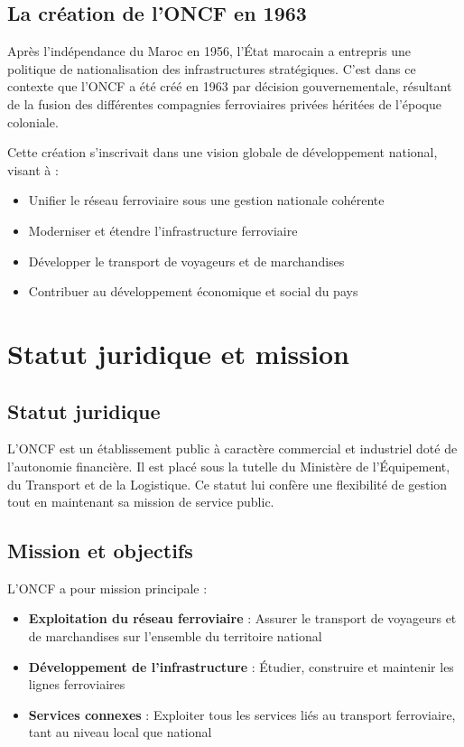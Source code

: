 \subsection{La création de l'ONCF en 1963}

Après l'indépendance du Maroc en 1956, l'État marocain a entrepris une politique de nationalisation des infrastructures stratégiques. C'est dans ce contexte que l'ONCF a été créé en 1963 par décision gouvernementale, résultant de la fusion des différentes compagnies ferroviaires privées héritées de l'époque coloniale.

Cette création s'inscrivait dans une vision globale de développement national, visant à :
\begin{itemize}
    \item Unifier le réseau ferroviaire sous une gestion nationale cohérente
    \item Moderniser et étendre l'infrastructure ferroviaire
    \item Développer le transport de voyageurs et de marchandises
    \item Contribuer au développement économique et social du pays
\end{itemize}

\section{Statut juridique et mission}

\subsection{Statut juridique}

L'ONCF est un établissement public à caractère commercial et industriel doté de l'autonomie financière. Il est placé sous la tutelle du Ministère de l'Équipement, du Transport et de la Logistique. Ce statut lui confère une flexibilité de gestion tout en maintenant sa mission de service public.

\subsection{Mission et objectifs}

L'ONCF a pour mission principale :
\begin{itemize}
    \item \textbf{Exploitation du réseau ferroviaire} : Assurer le transport de voyageurs et de marchandises sur l'ensemble du territoire national
    \item \textbf{Développement de l'infrastructure} : Étudier, construire et maintenir les lignes ferroviaires
    \item \textbf{Services connexes} : Exploiter tous les services liés au transport ferroviaire, tant au niveau local que national
\end{itemize}

